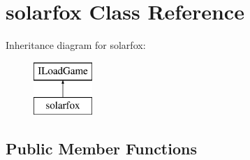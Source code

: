 \section{solarfox Class Reference}
\label{classsolarfox}
Inheritance diagram for solarfox\+:\begin{figure}[H]
\begin{center}
\leavevmode
\includegraphics[height=2.000000cm]{classsolarfox}
\end{center}
\end{figure}
\subsection*{Public Member Functions}
